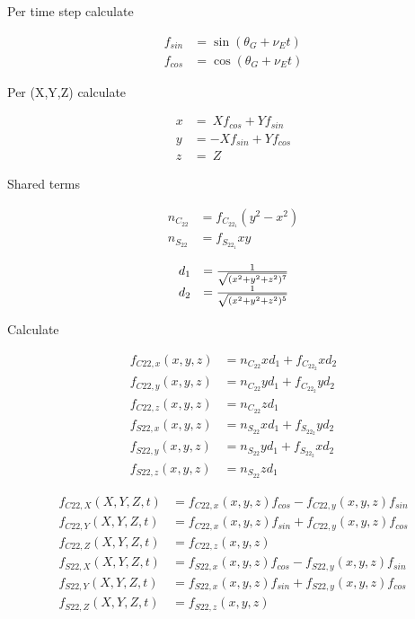 \documentclass{article}
\begin{document}
Per time step calculate

\begin{equation}
\begin{array}{ll}
f_{sin} &= \sin(\theta_G+\nu_Et) \\
f_{cos} &= \cos(\theta_G+\nu_Et)
\end{array}
\end{equation}

Per (X,Y,Z) calculate

\begin{equation}
\begin{array}{ll}
x&=~Xf_{cos}+Yf_{sin} \\
y&=-Xf_{sin}+Yf_{cos} \\
z&=~Z
\end{array}
\end{equation}

Shared terms

\begin{equation}
\begin{array}{ll}
n_{C_{22}} &= f_{C_{22_1}}(y^2-x^2) \\
n_{S_{22}} &= f_{S_{22_1}}xy
\end{array}
\end{equation}

\begin{equation}
\begin{array}{ll}
d_1 &= {1 \over \sqrt{(x^2+y^2+z^2)^7}} \\
d_2 &= {1 \over \sqrt{(x^2+y^2+z^2)^5}}
\end{array}
\end{equation}

Calculate

\begin{equation}
\begin{array}{ll}
f_{C22,x}(x,y,z) &= n_{C_{22}}xd_1 + f_{C_{22_2}}xd_2 \\
f_{C22,y}(x,y,z) &= n_{C_{22}}yd_1 + f_{C_{22_2}}yd_2 \\
f_{C22,z}(x,y,z) &= n_{C_{22}}zd_1 \\
f_{S22,x}(x,y,z) &= n_{S_{22}}xd_1 + f_{S_{22_2}}yd_2 \\
f_{S22,y}(x,y,z) &= n_{S_{22}}yd_1 + f_{S_{22_2}}xd_2 \\
f_{S22,z}(x,y,z) &= n_{S_{22}}zd_1
\end{array}
\end{equation}

\begin{equation}
\begin{array}{ll}
f_{C22,X}(X,Y,Z,t) &= f_{C22,x}(x,y,z)f_{cos} - f_{C22,y}(x,y,z)f_{sin} \\
f_{C22,Y}(X,Y,Z,t) &= f_{C22,x}(x,y,z)f_{sin} + f_{C22,y}(x,y,z)f_{cos} \\
f_{C22,Z}(X,Y,Z,t) &= f_{C22,z}(x,y,z) \\
f_{S22,X}(X,Y,Z,t) &= f_{S22,x}(x,y,z)f_{cos} - f_{S22,y}(x,y,z)f_{sin} \\
f_{S22,Y}(X,Y,Z,t) &= f_{S22,x}(x,y,z)f_{sin} + f_{S22,y}(x,y,z)f_{cos} \\
f_{S22,Z}(X,Y,Z,t) &= f_{S22,z}(x,y,z)
\end{array}
\end{equation}
\end{document}
